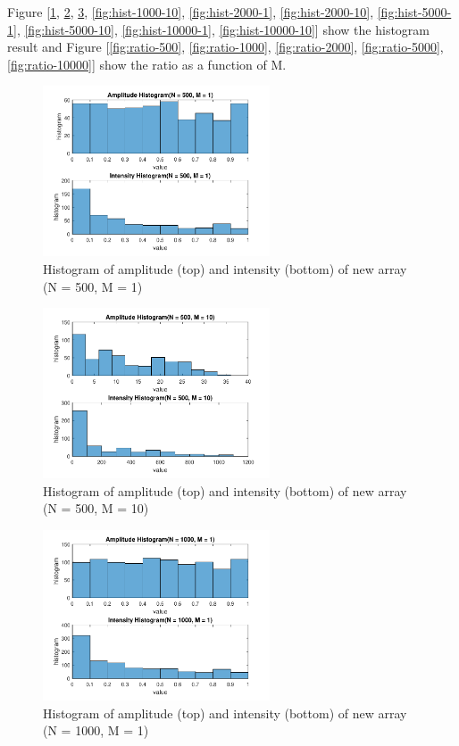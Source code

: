 \documentclass{article}
\begin{document}
Figure [\ref{fig:hist-500-1}, \ref{fig:hist-500-10}, \ref{fig:hist-1000-1}, \ref{fig:hist-1000-10}, \ref{fig:hist-2000-1}, \ref{fig:hist-2000-10}, 
\ref{fig:hist-5000-1}, \ref{fig:hist-5000-10}, \ref{fig:hist-10000-1}, \ref{fig:hist-10000-10}] show the histogram result and Figure
[\ref{fig:ratio-500}, \ref{fig:ratio-1000}, \ref{fig:ratio-2000}, \ref{fig:ratio-5000}, \ref{fig:ratio-10000}] show the ratio as a function of
M.

\begin{figure}[H]
	\centering
	\includegraphics[width = 0.6\textwidth]{src/2pi/hist_500_1.pdf}
	\caption{Histogram of amplitude (top) and intensity (bottom) of new array (N = 500, M = 1)}
	\label{fig:hist-500-1}
\end{figure}
\begin{figure}[H]
	\centering
	\includegraphics[width = 0.6\textwidth]{src/2pi/hist_500_10.pdf}
	\caption{Histogram of amplitude (top) and intensity (bottom) of new array (N = 500, M = 10)}
	\label{fig:hist-500-10}
\end{figure}
\begin{figure}[H]
	\centering
	\includegraphics[width = 0.6\textwidth]{src/2pi/hist_1000_1.pdf}
	\caption{Histogram of amplitude (top) and intensity (bottom) of new array (N = 1000, M = 1)}
	\label{fig:hist-1000-1}
\end{figure}
\end{document}
